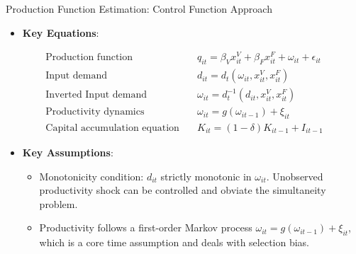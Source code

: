 \documentclass[aspectratio=169]{beamer}  %
\begin{document}
\begin{frame}{Production Function Estimation: Control Function Approach }
    \begin{itemize}
        \item \textbf{Key Equations}:
    \end{itemize}
    \begin{align*}
        \text{Production function} &\quad q_{it} = \beta_V x_{it}^V + \beta_F x_{it}^F + \omega_{it} + \epsilon_{it} \\
        \text{Input demand} &\quad d_{it} = d_t(\omega_{it}, x_{it}^V, x_{it}^F) \\
        \text{Inverted Input demand} &\quad \omega_{it} = d_t^{-1}(d_{it}, x_{it}^V, x_{it}^F) \\
        \text{Productivity dynamics} &\quad \omega_{it} = g(\omega_{it-1}) + \xi_{it} \\
        \text{Capital accumulation equation} &\quad  K_{it} = (1-\delta)K_{it-1} + I_{it-1}
    \end{align*}
        \begin{itemize}
        \item \textbf{Key Assumptions}:
        \begin{itemize}
            \item Monotonicity condition: $d_{it}$ strictly monotonic in $\omega_{it}$. Unobserved productivity shock can be controlled and obviate the simultaneity problem.
            \item Productivity follows a first-order Markov process $\omega_{it} = g(\omega_{it-1}) + \xi_{it}$, which is a core time assumption and deals with selection bias.
        \end{itemize}
    \end{itemize}
\end{frame}
\end{document}
